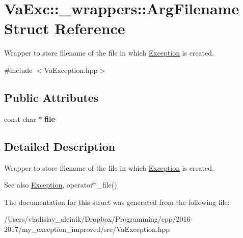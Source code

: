 \hypertarget{struct_va_exc_1_1__wrappers_1_1_arg_filename}{}\section{Va\+Exc\+:\+:\+\_\+wrappers\+:\+:Arg\+Filename Struct Reference}
\label{struct_va_exc_1_1__wrappers_1_1_arg_filename}


Wrapper to store filename of the file in which \hyperlink{class_va_exc_1_1_exception}{Exception} is created.  




{\ttfamily \#include $<$Va\+Exception.\+hpp$>$}

\subsection*{Public Attributes}
\begin{DoxyCompactItemize}
\item 
\mbox{\label{struct_va_exc_1_1__wrappers_1_1_arg_filename_a8cfa8a2d44c59823dcaab8de59b74c78}} 
const char $\ast$ {\bfseries file}
\end{DoxyCompactItemize}


\subsection{Detailed Description}
Wrapper to store filename of the file in which \hyperlink{class_va_exc_1_1_exception}{Exception} is created. 

\begin{DoxySeeAlso}{See also}
\hyperlink{class_va_exc_1_1_exception}{Exception}, operator\char`\"{}\char`\"{}\+\_\+file() 
\end{DoxySeeAlso}


The documentation for this struct was generated from the following file\+:\begin{DoxyCompactItemize}
\item 
/\+Users/vladislav\+\_\+aleinik/\+Dropbox/\+Programming/cpp/2016-\/2017/my\+\_\+exception\+\_\+improved/src/Va\+Exception.\+hpp\end{DoxyCompactItemize}
